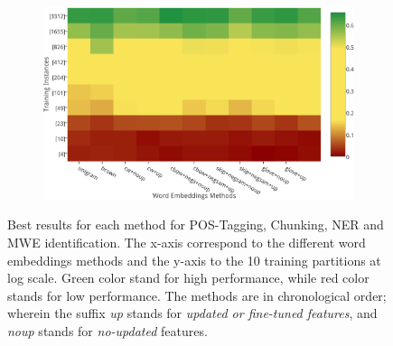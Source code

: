 \begin{figure}
\begin{subfigure}{7cm}
	\label{ner}
\end{subfigure}
\begin{subfigure}{7cm}
	\centering
    \includegraphics[scale=0.4]{plots/map-mwe-color-invert}
	\label{mwe}
\end{subfigure}
\caption{Best results for each method for POS-Tagging, Chunking, NER and MWE identification. The x-axis correspond to the different word embeddings methods and the y-axis to the 10 training partitions at log scale. Green color stand for high performance, while red color stands for low performance. The methods are in chronological order; wherein the suffix \textit{up} stands for \textit{updated or fine-tuned features}, and \textit{noup} stands for \textit{no-updated} features.}
\label{fig:heatmaps}
\end{figure}


